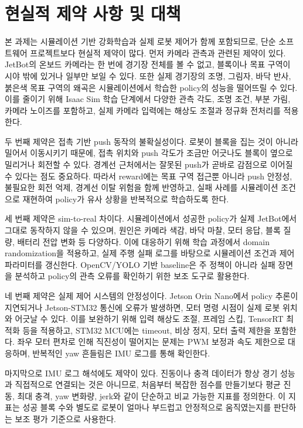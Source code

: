 \documentclass[titlepage]{pnureport}
\begin{document}
\chapter{현실적 제약 사항 및 대책}

본 과제는 시뮬레이션 기반 강화학습과 실제 로봇 제어가 함께 포함되므로, 단순 소프트웨어 프로젝트보다 현실적 제약이 많다. 먼저 카메라 관측과 관련된 제약이 있다. JetBot의 온보드 카메라는 한 번에 경기장 전체를 볼 수 없고, 블록이나 목표 구역이 시야 밖에 있거나 일부만 보일 수 있다. 또한 실제 경기장의 조명, 그림자, 바닥 반사, 붉은색 목표 구역의 왜곡은 시뮬레이션에서 학습한 policy의 성능을 떨어뜨릴 수 있다. 이를 줄이기 위해 Isaac Sim 학습 단계에서 다양한 관측 각도, 조명 조건, 부분 가림, 카메라 노이즈를 포함하고, 실제 카메라 입력에는 해상도 조절과 정규화 전처리를 적용한다.

두 번째 제약은 접촉 기반 push 동작의 불확실성이다. 로봇이 블록을 집는 것이 아니라 밀어서 이동시키기 때문에, 접촉 위치와 push 각도가 조금만 어긋나도 블록이 옆으로 밀리거나 회전할 수 있다. 경계선 근처에서는 잘못된 push가 곧바로 감점으로 이어질 수 있다는 점도 중요하다. 따라서 reward에는 목표 구역 접근뿐 아니라 push 안정성, 불필요한 회전 억제, 경계선 이탈 위험을 함께 반영하고, 실패 사례를 시뮬레이션 조건으로 재현하여 policy가 유사 상황을 반복적으로 학습하도록 한다.

세 번째 제약은 sim-to-real 차이다. 시뮬레이션에서 성공한 policy가 실제 JetBot에서 그대로 동작하지 않을 수 있으며, 원인은 카메라 색감, 바닥 마찰, 모터 응답, 블록 질량, 배터리 전압 변화 등 다양하다. 이에 대응하기 위해 학습 과정에서 domain randomization을 적용하고, 실제 주행 실패 로그를 바탕으로 시뮬레이션 조건과 제어 파라미터를 갱신한다. OpenCV/YOLO 기반 baseline은 주 정책이 아니라 실패 장면을 분석하고 policy의 관측 오류를 확인하기 위한 보조 도구로 활용한다.

네 번째 제약은 실제 제어 시스템의 안정성이다. Jetson Orin Nano에서 policy 추론이 지연되거나 Jetson-STM32 통신에 오류가 발생하면, 모터 명령 시점이 실제 로봇 위치와 어긋날 수 있다. 이를 보완하기 위해 입력 해상도 조절, 프레임 스킵, TensorRT 최적화 등을 적용하고, STM32 MCU에는 timeout, 비상 정지, 모터 출력 제한을 포함한다. 좌우 모터 편차로 인해 직진성이 떨어지는 문제는 PWM 보정과 속도 제한으로 대응하며, 반복적인 yaw 흔들림은 IMU 로그를 통해 확인한다.

마지막으로 IMU 로그 해석에도 제약이 있다. 진동이나 충격 데이터가 항상 경기 성능과 직접적으로 연결되는 것은 아니므로, 처음부터 복잡한 점수를 만들기보다 평균 진동, 최대 충격, yaw 변화량, jerk와 같이 단순하고 비교 가능한 지표를 정의한다. 이 지표는 성공 블록 수와 별도로 로봇이 얼마나 부드럽고 안정적으로 움직였는지를 판단하는 보조 평가 기준으로 사용한다.
\end{document}

